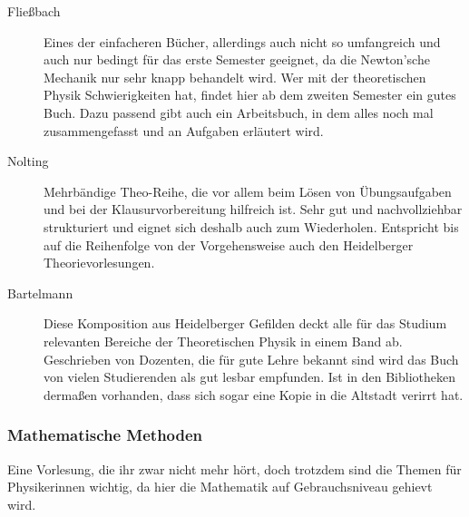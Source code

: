 \begin{description}
\item[Fließbach]{
		Eines der einfacheren Bücher, allerdings auch nicht so umfangreich und auch nur bedingt für das erste Semester geeignet, da die Newton'sche Mechanik nur sehr knapp behandelt wird. Wer mit der theoretischen Physik Schwierigkeiten hat, findet hier ab dem zweiten Semester ein gutes Buch. Dazu passend gibt auch ein Arbeitsbuch, in dem alles noch mal zusammengefasst und an Aufgaben erläutert wird.}

\item[Nolting]{
		Mehrbändige Theo-Reihe, die vor allem beim Lösen von Übungsaufgaben und bei der Klausurvorbereitung hilfreich ist. Sehr gut und nachvollziehbar strukturiert und eignet sich deshalb auch zum Wiederholen. Entspricht bis auf die Reihenfolge von der Vorgehensweise auch den Heidelberger Theorievorlesungen.}

\item[Bartelmann]{
		Diese Komposition aus Heidelberger Gefilden deckt alle für das Studium relevanten Bereiche der Theoretischen Physik in einem Band ab. Geschrieben von Dozenten, die für gute Lehre bekannt sind wird das Buch von vielen Studierenden als gut lesbar empfunden. Ist in den Bibliotheken dermaßen vorhanden, dass sich sogar eine Kopie in die Altstadt verirrt hat.}
\end{description}

\subsubsection{Mathematische Methoden}

Eine Vorlesung, die ihr zwar nicht mehr hört, doch trotzdem sind die Themen für Physikerinnen wichtig, da hier die Mathematik auf Gebrauchsniveau gehievt wird.

